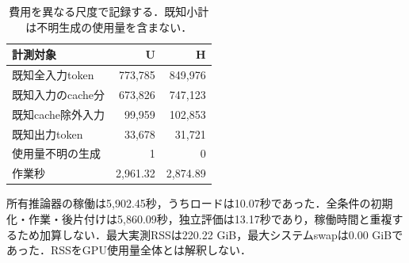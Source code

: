 \begin{table}[tb]
\centering\footnotesize\setlength{\tabcolsep}{3pt}
\caption{費用を異なる尺度で記録する．既知小計は不明生成の使用量を含まない．}
\begin{tabular}{lrr}
計測対象 & U & H \\ \hline
既知全入力token & 773,785 & 849,976 \\
既知入力のcache分 & 673,826 & 747,123 \\
既知cache除外入力 & 99,959 & 102,853 \\
既知出力token & 33,678 & 31,721 \\
使用量不明の生成 & 1 & 0 \\
作業秒 & 2,961.32 & 2,874.89 \\
\hline\end{tabular}
\end{table}
所有推論器の稼働は5,902.45秒，うちロードは10.07秒であった．全条件の初期化・作業・後片付けは5,860.09秒，独立評価は13.17秒であり，稼働時間と重複するため加算しない．最大実測RSSは220.22 GiB，最大システムswapは0.00 GiBであった．RSSをGPU使用量全体とは解釈しない．
